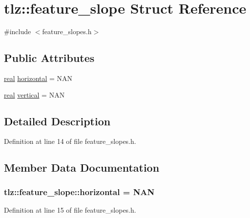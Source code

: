 \hypertarget{structtlz_1_1feature__slope}{}\section{tlz\+:\+:feature\+\_\+slope Struct Reference}
\label{structtlz_1_1feature__slope}


{\ttfamily \#include $<$feature\+\_\+slopes.\+h$>$}

\subsection*{Public Attributes}
\begin{DoxyCompactItemize}
\item 
\hyperlink{namespacetlz_a15fd37cce97f2b8b606af18c2615f602}{real} \hyperlink{structtlz_1_1feature__slope_af8685842a790e87ae4bed5a358b68e97}{horizontal} = N\+AN
\item 
\hyperlink{namespacetlz_a15fd37cce97f2b8b606af18c2615f602}{real} \hyperlink{structtlz_1_1feature__slope_a5dce39e1652c504075245a3e6c2decfc}{vertical} = N\+AN
\end{DoxyCompactItemize}


\subsection{Detailed Description}


Definition at line 14 of file feature\+\_\+slopes.\+h.



\subsection{Member Data Documentation}
\subsubsection[{\texorpdfstring{horizontal}{horizontal}}]{ tlz\+::feature\+\_\+slope\+::horizontal = N\+AN}\hypertarget{structtlz_1_1feature__slope_af8685842a790e87ae4bed5a358b68e97}{}\label{structtlz_1_1feature__slope_af8685842a790e87ae4bed5a358b68e97}


Definition at line 15 of file feature\+\_\+slopes.\+h.

